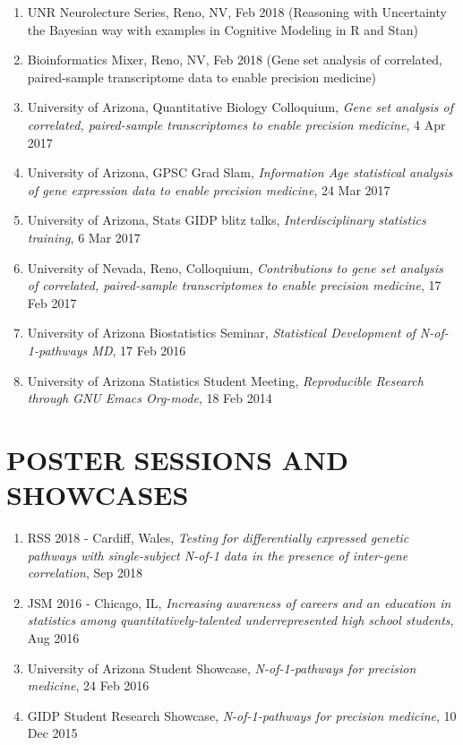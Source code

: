 \documentclass[paper=a4,fontsize=11pt]{scrartcl} %
\newcommand{\NewPart}[2]{\section*{\uppercase{#1} #2 }}
\newcommand{\TalkEntry}[4]{
		\noindent #1, #2, #3 #4}
\begin{document}
\vspace{-7pt}
\begin{enumerate}

  \item\TalkEntry{UNR Neurolecture Series}{Reno, NV}{Feb 2018}{(Reasoning with Uncertainty the Bayesian way with examples in Cognitive Modeling in R and Stan)}

\item\TalkEntry{Bioinformatics Mixer}{Reno, NV}{Feb 2018}{(Gene set analysis of correlated, paired-sample transcriptome data to enable precision medicine)}
  
\item\TalkEntry{University of Arizona, Quantitative Biology Colloquium}{\textit{Gene set analysis of correlated, paired-sample transcriptomes to enable precision medicine}}{4 Apr 2017}{}  
  \item\TalkEntry{University of Arizona, GPSC Grad Slam}{\textit{Information Age statistical analysis of gene expression data to enable precision medicine}}{24 Mar 2017}{}
\item\TalkEntry{University of Arizona, Stats GIDP blitz talks}{\textit{Interdisciplinary statistics training}}{6 Mar 2017}{}

\item\TalkEntry{University of Nevada, Reno, Colloquium}{\textit{Contributions to gene set analysis of correlated, paired-sample transcriptomes to enable precision medicine}}{17 Feb 2017}{}

\item\TalkEntry{University of Arizona Biostatistics Seminar}{\textit{Statistical Development of N-of-1-pathways MD}}{17 Feb 2016}{}
\item\TalkEntry{University of Arizona Statistics Student Meeting}{\textit{Reproducible Research through GNU Emacs Org-mode}}{18 Feb 2014}{}
\vspace{-7pt}
\end{enumerate}

\NewPart{Poster sessions and Showcases}{}
\vspace{-7pt}
\begin{enumerate}
  \item\TalkEntry{RSS 2018 - Cardiff, Wales}{\textit{Testing for differentially expressed genetic pathways with single-subject N-of-1 data in the presence of inter-gene correlation}}{Sep 2018}{}
\item\TalkEntry{JSM 2016 - Chicago, IL}{\textit{Increasing awareness of careers and an education in statistics among quantitatively-talented underrepresented high school students}}{Aug 2016}{}
\item\TalkEntry{University of Arizona Student Showcase}{\textit{N-of-1-pathways for precision medicine}}{24 Feb 2016}{}
\item\TalkEntry{GIDP Student Research Showcase}{\textit{N-of-1-pathways for precision medicine}}{10 Dec 2015}{}
\vspace{-7pt}
\end{enumerate}
\end{document}
